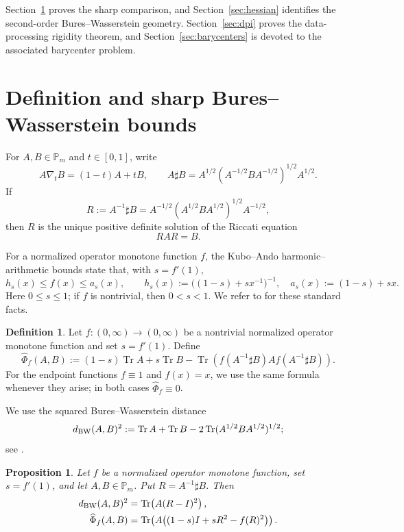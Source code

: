 \documentclass[11pt]{amsart}
\newtheorem{proposition}[theorem]{Proposition}
\theoremstyle{definition}
\newtheorem{definition}[theorem]{Definition}
\theoremstyle{remark}
\newcommand{\Pm}{\mathbb P_m}
\newcommand{\Tr}{\operatorname{Tr}}
\newcommand{\altPhi}{\widehat{\Phi}}
\begin{document}
	Section~\ref{sec:sharp-bw} proves the sharp comparison, and
Section~\ref{sec:hessian} identifies the second-order
Bures--Wasserstein geometry.
	Section~\ref{sec:dpi} proves the data-processing rigidity theorem, and Section~\ref{sec:barycenters} is devoted to the associated
	barycenter problem.
	
	\section{Definition and sharp Bures--Wasserstein bounds}
	\label{sec:sharp-bw}
	
	For $A,B\in\Pm$ and $t\in[0,1]$, write
	\[
	A\nabla_tB=(1-t)A+tB,
	\qquad
	A\sharp B
	=A^{1/2}(A^{-1/2}BA^{-1/2})^{1/2}A^{1/2}.
	\]
If
\[
R:=A^{-1}\sharp B
=A^{-1/2}(A^{1/2}BA^{1/2})^{1/2}A^{-1/2},
\]
then $R$ is the unique positive definite solution of the Riccati equation
\begin{equation}\label{eq:riccati}
	RAR=B.
\end{equation}
	
	For a normalized operator monotone function $f$, the Kubo--Ando
	harmonic--arithmetic bounds state that, with $s=f'(1)$,
	\begin{equation}\label{eq:harm-arith}
		h_s(x)\le f(x)\le a_s(x),
		\qquad
		h_s(x):=\bigl((1-s)+sx^{-1}\bigr)^{-1},
		\quad
		a_s(x):=(1-s)+sx.
	\end{equation}
	Here $0\le s\le1$; if $f$ is nontrivial, then $0<s<1$.  We refer to
	\cite{KuboAndo1980} for these standard facts.
	
	\begin{definition}\label{def:divergence}
		Let $f:(0,\infty)\to(0,\infty)$ be a nontrivial normalized operator
		monotone function and set $s=f'(1)$.  Define
		\begin{equation}\label{eq:divergence}
			\altPhi_f(A,B)
			:=(1-s)\Tr A+s\Tr B
			-\Tr\!\left(f(A^{-1}\sharp B)A f(A^{-1}\sharp B)\right).
		\end{equation}
		For the endpoint functions $f\equiv1$ and $f(x)=x$, we use the same
		formula whenever they arise; in both cases $\altPhi_f\equiv0$.
	\end{definition}
	
	We use the squared Bures--Wasserstein distance
	\[
	d_{\rm BW}(A,B)^2
	:=\Tr A+\Tr B
	-2\Tr(A^{1/2}BA^{1/2})^{1/2};
	\]
	see \cite{BhatiaJainLim2019}.
	
	\begin{proposition}
		\label{prop:master-representation}
		Let $f$ be a normalized operator monotone function, set $s=f'(1)$, and
		let $A,B\in\Pm$.  Put $R=A^{-1}\sharp B$.  Then
		\begin{align}
			d_{\rm BW}(A,B)^2
			&=\Tr\!\left(A(R-I)^2\right), \label{eq:bw-R}\\
			\altPhi_f(A,B)
			&=\Tr\!\left(
			A\bigl((1-s)I+sR^2-f(R)^2\bigr)
			\right). \label{eq:phi-R}
		\end{align}
	\end{proposition}
	
\end{document}
